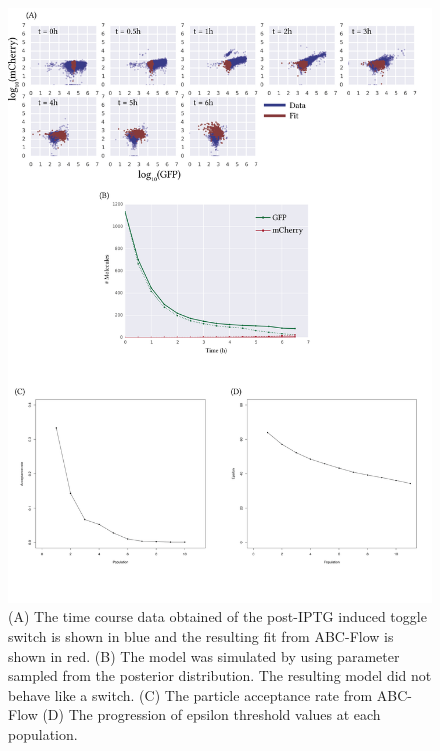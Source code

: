 \begin{figure}[htbp]
\centerfloat%
	\includegraphics[width=1.2\textwidth]{../../chapters/chapterABCFlow/images/2D_real_res_IPTG-01.png}
	\caption[ABC-Flow fit to post-\acrshort{atc} time course data]{\label{fig:1d-real-res-iptg} (A) The time course data obtained of the post-IPTG induced toggle switch is shown in blue and the resulting fit from ABC-Flow is shown in red. (B) The model was simulated by using parameter sampled from the posterior distribution. The resulting model did not behave like a switch. (C) The particle acceptance rate from ABC-Flow (D) The progression of epsilon threshold values at each population.  }
\end{figure}

